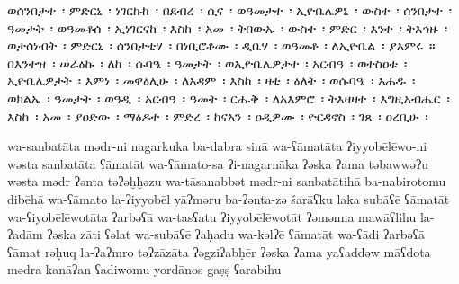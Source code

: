 
\begin{ethiopictext}
    ወሰንበታተ~፡ ምድርኒ~፡ ነገርኩከ~፡ በደብረ~፡ ሲና~፡ ወዓመታተ~፡
    ኢዮቤሌዎኒ~፡ ውስተ~፡ ሰንበታተ~፡ ዓመታት~፡ ወዓመቶሰ~፡ ኢነገርናከ~፡
    እስከ~፡ አመ~፡ ትበውኡ~፡ ውስተ~፡ ምድር~፡ እንተ~፡ ትእኅዙ~፡
    ወታሰነብት~፡ ምድርኒ~፡ ሰንበታቲሃ~፡ በነቢሮቶሙ~፡ ዲቤሃ~፡ 
    ወዓመቶ~፡ ለኢዮቤል~፡ ያእምሩ~። 
    በእንተዝ~፡ ሠራዕኩ~፡ ለከ~፡ 
    ሱባዔ~፡ ዓመታት~፡ ወኢዮቤሌዎታተ~፡ አርብዓ~፡ ወተስዐቱ~፡ ኢዮቤሌዎታት~፡
    እምነ~፡ መዋዕሊሁ~፡ ለአዳም~፡ እስከ~፡ ዛቲ~፡ ዕለት~፡ ወሱባዔ~፡
    አሐዱ~፡ ወክልኤ~፡ ዓመታት~፡ ወዓዲ~፡ አርብዓ~፡ ዓመት~፡ 
    ርሑቅ~፡ ለአእምሮ~፡ ትእዛዛተ~፡ እግዚአብሔር~፡ እስከ~፡ አመ~፡ ያዐድው~፡
    ማዕዶተ~፡ ምድረ~፡ ከናአን~፡ ዐዲዎሙ~፡ ዮርዳኖስ~፡ ገጸ~፡ ዐረቢሁ~፡
\end{ethiopictext}
\begin{transliteration}
    wa-sanbatāta mədr-ni nagarkuka ba-dabra sinā wa-ʕāmatāta
    ʔiyyobēlēwo-ni wəsta sanbatāta ʕāmatāt wa-ʕāmato-sa ʔi-nagarnāka
    ʔəska ʔama təbawwəʔu wəsta mədr ʔənta təʔəḫḫəzu
    wa-tāsanabbət mədr-ni sanbatātihā ba-nabirotomu dibēhā
    wa-ʕāmato la-ʔiyyobēl yāʔməru
    ba-ʔənta-zə śarāʕku laka
    subāʕē ʕāmatāt wa-ʕiyobēlēwotāta ʔarbəʕā wa-tasʕatu ʔiyyobēlēwotāt
    ʔəmənna mawāʕlihu la-ʔadām ʔəska zāti ʕəlat wa-subāʕē
    ʔaḥadu wa-kəlʔē ʕāmatāt wa-ʕādi ʔarbəʕā ʕāmat
    rəḥuq la-ʔaʔmro təʔzāzāta ʔəgziʔabḥēr ʔəska ʔama yaʕaddəw
    māʕdota mədra kanāʔan ʕadiwomu yordānos gaṣṣ ʕarabihu

\end{transliteration}

